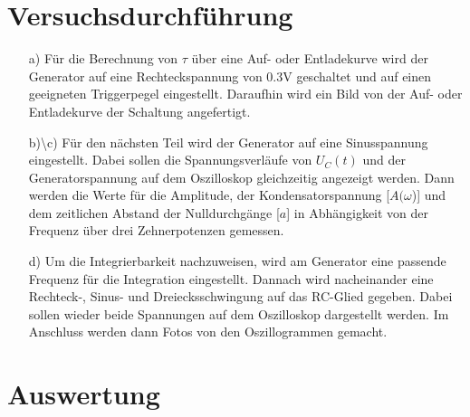 \section{Versuchsdurchführung}
\begin{enumerate}
\item[a)] Für die Berechnung von $\tau$ über eine Auf- oder Entladekurve wird der 
          Generator auf eine Rechteckspannung von 0.3V geschaltet und auf einen geeigneten 
          Triggerpegel eingestellt. Daraufhin wird ein Bild von der Auf- 
          oder Entladekurve der Schaltung angefertigt.\\
\item[b)\textbackslash c)] Für den nächsten Teil wird der Generator auf eine Sinusspannung 
          eingestellt. Dabei sollen die Spannungsverläufe von $U_C(t)$ und der 
          Generatorspannung auf dem Oszilloskop gleichzeitig angezeigt werden. 
          Dann werden die Werte für die Amplitude, der Kondensatorspannung 
          [$A(\omega$)] und dem zeitlichen Abstand der Nulldurchgänge 
          [$a$] in Abhängigkeit von der Frequenz über drei Zehnerpotenzen gemessen.\\
\item[d)] Um die Integrierbarkeit nachzuweisen, wird am Generator eine passende 
          Frequenz für die Integration eingestellt. Dannach wird nacheinander eine 
          Rechteck-, Sinus- und Dreiecksschwingung auf das RC-Glied gegeben. 
          Dabei sollen wieder beide Spannungen auf dem Oszilloskop dargestellt 
          werden. Im Anschluss werden dann Fotos von den Oszillogrammen gemacht.
\end{enumerate}

\section{Auswertung}

  
